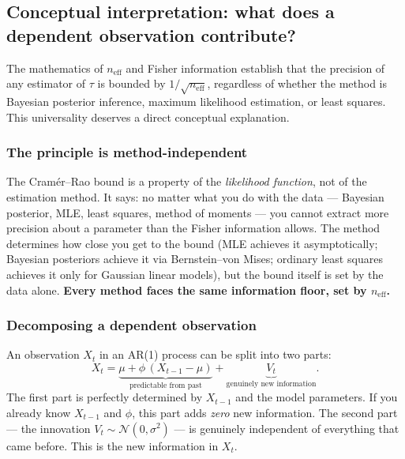 \documentclass[11pt, a4paper]{article}
\begin{document}
\subsection{Conceptual interpretation: what does a dependent observation contribute?}
\label{subsec:neff_conceptual}

The mathematics of $n_\mathrm{eff}$ and Fisher information establish that the precision
of any estimator of $\tau$ is bounded by $1/\sqrt{n_\mathrm{eff}}$, regardless of
whether the method is Bayesian posterior inference, maximum likelihood estimation,
or least squares.
This universality deserves a direct conceptual explanation.

\subsubsection*{The principle is method-independent}

The Cram\'er--Rao bound is a property of the \emph{likelihood function}, not of the
estimation method.
It says: no matter what you do with the data --- Bayesian posterior, MLE, least
squares, method of moments --- you cannot extract more precision about a parameter
than the Fisher information allows.
The method determines how close you get to the bound
(MLE achieves it asymptotically; Bayesian posteriors achieve it via
Bernstein--von Mises; ordinary least squares achieves it only for Gaussian linear
models), but the bound itself is set by the data alone.
\textbf{Every method faces the same information floor, set by $n_\mathrm{eff}$.}

\subsubsection*{Decomposing a dependent observation}

An observation $X_t$ in an AR(1) process can be split into two parts:
\begin{equation}
    X_t
    = \underbrace{\mu + \phi\,(X_{t-1} - \mu)}_{\text{predictable from past}}
    + \underbrace{V_t}_{\text{genuinely new information}}.
\end{equation}
The first part is perfectly determined by $X_{t-1}$ and the model parameters.
If you already know $X_{t-1}$ and $\phi$, this part adds \emph{zero} new information.
The second part --- the innovation $V_t \sim \mathcal{N}(0, \sigma^2)$ --- is
genuinely independent of everything that came before.
This is the new information in $X_t$.
\end{document}
